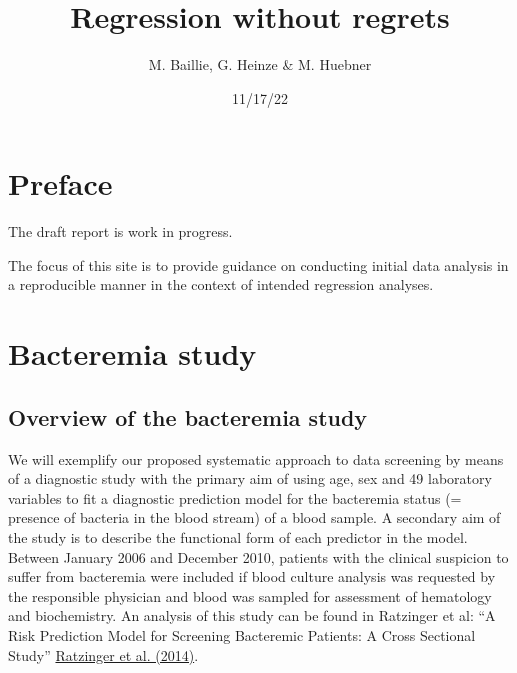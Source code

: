 \documentclass[
  letterpaper,
  DIV=11,
  numbers=noendperiod]{scrreport}
\title{Regression without regrets}
\author{M. Baillie, G. Heinze \& M. Huebner}
\date{11/17/22}
\renewcommand*\contentsname{Table of contents}
\newcommand\contentsname{Table of contents}
\begin{document}
\maketitle
\ifdefined\Shaded\renewenvironment{Shaded}{\begin{tcolorbox}[frame hidden, interior hidden, sharp corners, borderline west={3pt}{0pt}{shadecolor}, boxrule=0pt, enhanced, breakable]}{\end{tcolorbox}}\fi

\renewcommand*\contentsname{Table of contents}
{
\hypersetup{linkcolor=}
\setcounter{tocdepth}{2}
\tableofcontents
}

\hypertarget{preface}{%
\chapter*{Preface}\label{preface}}


The draft report is work in progress.

The focus of this site is to provide guidance on conducting initial data
analysis in a reproducible manner in the context of intended regression
analyses.


\hypertarget{Bacteremia}{%
\chapter{Bacteremia study}\label{Bacteremia}}

\hypertarget{overview-of-the-bacteremia-study}{%
\section{Overview of the bacteremia
study}\label{overview-of-the-bacteremia-study}}

We will exemplify our proposed systematic approach to data screening by
means of a diagnostic study with the primary aim of using age, sex and
49 laboratory variables to fit a diagnostic prediction model for the
bacteremia status (= presence of bacteria in the blood stream) of a
blood sample. A secondary aim of the study is to describe the functional
form of each predictor in the model. Between January 2006 and December
2010, patients with the clinical suspicion to suffer from bacteremia
were included if blood culture analysis was requested by the responsible
physician and blood was sampled for assessment of hematology and
biochemistry. An analysis of this study can be found in Ratzinger et al:
``A Risk Prediction Model for Screening Bacteremic Patients: A Cross
Sectional Study''
\href{https://doi.org/10.1371/journal.pone.0106765}{Ratzinger et al.
(2014)}.
\end{document}
